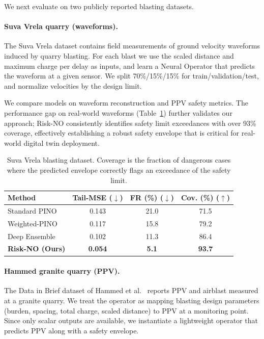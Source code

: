 \documentclass{article}
\theoremstyle{plain}
\theoremstyle{definition}
\theoremstyle{remark}
\begin{document}
We next evaluate on two publicly reported blasting datasets.

\paragraph{Suva Vrela quarry (waveforms).}
The Suva Vrela dataset \citep{kuzmanovic2013prediction} contains field measurements of ground velocity waveforms induced by quarry blasting. For each blast we use the scaled distance and maximum charge per delay as inputs, and learn a Neural Operator that predicts the waveform at a given sensor. We split 70\%/15\%/15\% for train/validation/test, and normalize velocities by the design limit.

We compare models on waveform reconstruction and PPV safety metrics. The performance gap on real-world waveforms (Table~\ref{tab:suvavrela}) further validates our approach; Risk-NO consistently identifies safety limit exceedances with over 93\% coverage, effectively establishing a robust safety envelope that is critical for real-world digital twin deployment.

\begin{table}[t]
    \centering
    \caption{Suva Vrela blasting dataset. Coverage is the fraction of dangerous cases where the predicted envelope correctly flags an exceedance of the safety limit.}
    \label{tab:suvavrela}
    \begin{tabular}{p{2.0cm}ccc}
        \toprule
Method & Tail-MSE ($\downarrow$) & FR (\%) ($\downarrow$) & Cov. (\%) ($\uparrow$) \\
        \midrule
        Standard PINO   & 0.143 & 21.0 & 71.5 \\
        Weighted-PINO   & 0.117 & 15.8 & 79.2 \\
        Deep Ensemble   & 0.102 & 11.3 & 86.4 \\
        \textbf{Risk-NO (Ours)} & \textbf{0.054} & \textbf{5.1} & \textbf{93.7} \\
        \bottomrule
    \end{tabular}
\end{table}

\paragraph{Hammed granite quarry (PPV).}
The Data in Brief dataset of Hammed et al.\ \citep{hammed2018data} reports PPV and airblast measured at a granite quarry. We treat the operator as mapping blasting design parameters (burden, spacing, total charge, scaled distance) to PPV at a monitoring point. Since only scalar outputs are available, we instantiate a lightweight operator that predicts PPV along with a safety envelope.
\end{document}
